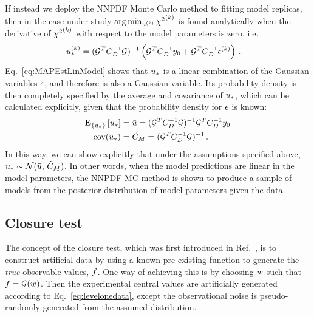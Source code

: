 If instead we deploy the NNPDF Monte
Carlo method to fitting model replicas, then in the case under study
$\arg\min_{u^{(k)}} {\chi^2}^{(k)}$ is found analytically when the derivative of
${\chi^2}^{(k)}$ with respect to the model parameters is zero, i.e.
\begin{equation}
    \begin{split}
        \label{eq:MAPEstLinModel}
        u_*^{(k)} &= (\mathcal{G}^T C_{D}^{-1} \mathcal{G})^{-1}
        \left(
            \mathcal{G}^T C_{D}^{-1} y_0 +
            \mathcal{G}^T C_{D}^{-1} \epsilon^{(k)}
        \right) \, .
    \end{split}
\end{equation}
Eq.~\ref{eq:MAPEstLinModel} shows that $u_*$ is a linear
combination of the Gaussian variables $\epsilon$, and therefore is
also a Gaussian variable. Its
probability density is then completely specified by the average and
covariance of $u_*$, which can be calculated explicitly, given that the
probability density for $\epsilon$ is known:
\begin{align}
    \mathbf{E}_{\{ u_* \}} \left[ u_* \right] &=
    \tilde{u} = (\mathcal{G}^T C_{D}^{-1} \mathcal{G})^{-1} \mathcal{G}^T
    C_{D}^{-1} y_0 \\
    {\rm cov}(u_*) &= \tilde{C}_M = (\mathcal{G}^T C_{D}^{-1} \mathcal{G})^{-1} \, .
\end{align}
In this way, we can show explicitly that under the assumptions specified above,
$u_* \sim \mathcal{N}(\tilde{u}, \, \tilde{C}_M)$.
In other words, when the model predictions are linear in the model parameters,
the NNPDF MC method is shown to produce a sample of models from the posterior
distribution of model parameters given the data.

\subsection{Closure test}
\label{sec:closure-test-intro}

The concept of the closure test, which was first introduced in
Ref.~\cite{nnpdf30}, is to construct artificial data by using a known
pre-existing function to generate the {\em true} observable values, $f$.
One way of achieving this is by choosing $w$ such that $f =
\mathcal{G}(w)$. Then the experimental central values are artificially
generated according to Eq.~\ref{eq:levelonedata}, except the observational noise
is pseudo-randomly generated from the assumed distribution.


